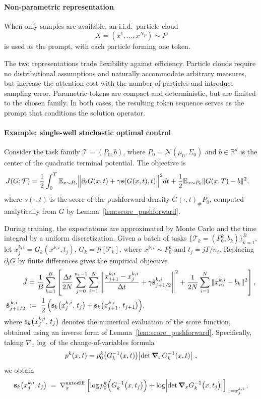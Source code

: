 \documentclass[preprint]{elsarticle}
\newcommand{\R}{\mathbb{R}}
\newcommand{\E}{\mathbb{E}}
\newcommand{\sT}{\mathcal{T}}
\newcommand{\sG}{\mathcal{G}}
\newcommand{\inv}{^{-1}}
\begin{document}
\paragraph{Non-parametric representation}
When only samples are available, an i.i.d.\ particle cloud
\[
X=(x^1,\ldots,x^{N_P})\sim P
\]
is used as the prompt, with each particle forming one token.

The two representations trade flexibility against efficiency. Particle clouds require no distributional assumptions and naturally accommodate arbitrary measures, but increase the attention cost with the number of particles and introduce sampling error. Parametric tokens are compact and deterministic, but are limited to the chosen family. In both cases, the resulting token sequence serves as the prompt that conditions the solution operator.


\paragraph{Example: single-well stochastic optimal control}
Consider the task family $\sT=(P_0,b)$, where $P_0=\mathcal N(\mu_0,\Sigma_0)$ and $b\in\R^d$ is the center of the quadratic terminal potential. The objective is
\begin{align}
J(G;\sT)
&=
\frac12
\int_0^T
\E_{x\sim P_0}
\Bigl\|
\partial_tG(x,t)+\gamma \mathbf{s}(G(x,t),t)
\Bigr\|^2dt
+
\frac12
\E_{x\sim P_0}
\|G(x,T)-b\|^2,
\label{equ:soc_functional}
\end{align}
where $s(\cdot,t)$ is the score of the pushforward density $G(\cdot,t)_\#P_0$, computed analytically from $G$ by Lemma~\ref{lem:score_pushforward}.

During training, the expectations are approximated by Monte Carlo and the time integral by a uniform discretization. Given a batch of tasks $\{\sT_k=(P_0^k,b_k)\}_{k=1}^B$, let $x_j^{k,i}=G_k(x^{k,i},t_j)$, $G_k=\sG[\sT_k]$, where $x^{k,i}\sim P_0^k$ and $t_j=jT/n_t$. Replacing $\partial_tG$ by finite differences gives the empirical objective
\begin{align}
\hat J
&=
\frac1B
\sum_{k=1}^{B}
\left[
\frac{\Delta t}{2N}
\sum_{j=0}^{n_t-1}
\sum_{i=1}^{N}
\left\|
\frac{x^{k,i}_{j+1}-x^{k,i}_{j}}{\Delta t}
+\gamma\hat{\mathbf{s}}_{j+1/2}^{k,i}
\right\|^2
+
\frac1{2N}
\sum_{i=1}^{N}
\|x_{n_t}^{k,i}-b_k\|^2
\right],
\label{equ:soc_empirical}\\
\hat{\mathbf{s}}^{\,k,i}_{j+1/2}
    \;&:=\;
    \frac12\,\Bigl(\mathbf{s}_k\bigl(x^{k,i}_{j},\,t_j\bigr)+\mathbf{s}_k\bigl(x^{k,i}_{j+1},\,t_{j+1}\bigr)\Bigr),
    \notag
\end{align}
where $\mathbf{s}_k\bigl(x^{k,i}_{j},\,t_j\bigr)$ denotes the numerical evaluation of the score function, obtained using an inverse form of Lemma~\ref{lem:score_pushforward}. Specifically, taking $\nabla_x\log$ of the change-of-variables formula
\[
    p^k(x,t)=p^k_0\qb{G_k\inv(x,t)}\bigl|\det\boldsymbol{\nabla}_xG_k\inv(x,t)\bigr|
    \ ,
\]
we obtain
\begin{align}
\mathbf{s}_k\qb{x^{k,i}_j,t_j} \;=\; \nabla_x^{\mathrm{autodiff}} \left[ \log p^k_0\Bigl(G_k\inv\qb{x,t_j}\Bigr) + \log\Bigl| \det\boldsymbol{\nabla}_x G_k\inv\qb{x,t_j} \Bigr| \right]_{\,x=x^{k,i}_j}, \label{equ:score_discrete}
\end{align}
\end{document}
